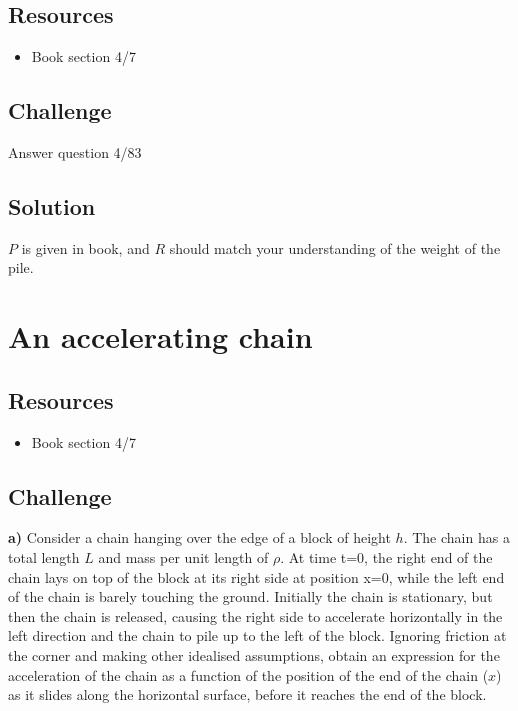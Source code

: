 \subsection*{Resources}
\begin{itemize}
    \item Book section 4/7
\end{itemize}

\subsection*{Challenge}
Answer question 4/83

\subsection*{Solution}
$P$ is given in book, and $R$ should match your understanding of the weight of the pile.




\newpage
\section{An accelerating chain}

\subsection*{Resources}
\begin{itemize}
    \item Book section 4/7
\end{itemize}

\subsection*{Challenge}
\textbf{a)} Consider a chain hanging over the edge of a block of height $h$. The chain has a total length $L$ and mass per unit length of $\rho$. At time t=0, the right end of the chain lays on top of the block at its right side at position x=0, while the left end of the chain is barely touching the ground. Initially the chain is stationary, but then the chain is released, causing the right side to accelerate horizontally in the left direction and the chain to pile up to the left of the block. Ignoring friction at the corner and making other idealised assumptions, obtain an expression for the acceleration of the chain as a function of the position of the end of the chain ($x$) as it slides along the horizontal surface, before it reaches the end of the block.

